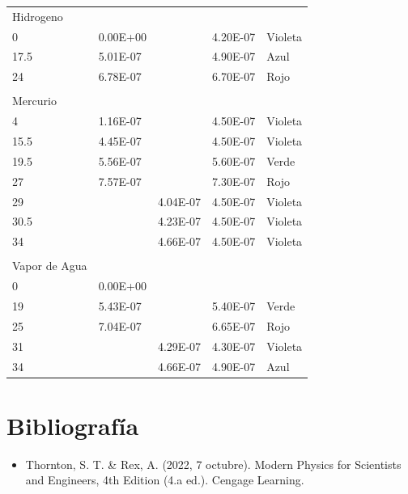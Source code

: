 \documentclass[a4paper,twocolumn,10pt]{article}
\begin{document}
\begin{table}
\begin{tabular}{lllll}
\rowcolor{cyan} Hidrogeno               &          &          &                  &                     \\
0                                       & 0.00E+00 &          & 4.20E-07         & Violeta             \\
17.5                                    & 5.01E-07 &          & 4.90E-07         & Azul                \\
24                                      & 6.78E-07 &          & 6.70E-07         & Rojo                \\
                                        &          &          &                  &                     \\
\rowcolor{cyan} Mercurio                &          &          &                  &                     \\
4                                       & 1.16E-07 &          & 4.50E-07         & Violeta             \\
15.5                                    & 4.45E-07 &          & 4.50E-07         & Violeta             \\
19.5                                    & 5.56E-07 &          & 5.60E-07         & Verde               \\
27                                      & 7.57E-07 &          & 7.30E-07         & Rojo                \\
29                                      &          & 4.04E-07 & 4.50E-07         & Violeta             \\
30.5                                    &          & 4.23E-07 & 4.50E-07         & Violeta             \\
34                                      &          & 4.66E-07 & 4.50E-07         & Violeta             \\
                                        &          &          &                  &                     \\
\rowcolor{cyan} Vapor de Agua           &          &          &                  &                     \\
0                                       & 0.00E+00 &          &                  &                     \\
19                                      & 5.43E-07 &          & 5.40E-07         & Verde               \\
25                                      & 7.04E-07 &          & 6.65E-07         & Rojo                \\
31                                      &          & 4.29E-07 & 4.30E-07         & Violeta             \\
34                                      &          & 4.66E-07 & 4.90E-07         & Azul               
\end{tabular}
\end{table}

\newpage
\section{Bibliografía}


\begin{itemize}
\item Thornton, S. T. \& Rex, A. (2022, 7 octubre). Modern Physics for Scientists and Engineers, 4th Edition (4.a ed.). Cengage Learning.
\end{itemize}
\end{document}
